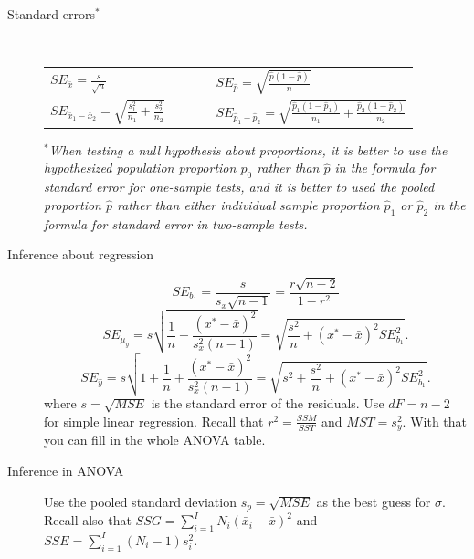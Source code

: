 \documentclass[10pt]{exam}
\newcommand{\ds}{\displaystyle}
\begin{document}
\begin{description}

\item[Standard errors$^*$] ~
\begin{center}
\begin{tabular}{lcl} 
$\ds SE_{\bar{x}} = \frac{s}{\sqrt{n}}$ & ~~~~ & $\ds SE_{\hat{p}} = \sqrt{\frac{\hat{p}(1-\hat{p})}{n}}$ \\
$\ds SE_{\bar{x}_1 - \bar{x}_2} = \sqrt{\frac{s_1^2}{n_1}+\frac{s_2^2}{n_2}}$ &  & $\ds SE_{\hat{p}_1-\hat{p}_2} = \sqrt{\frac{\hat{p}_1(1-\hat{p}_1)}{n_1}+\frac{\hat{p}_2(1-\hat{p}_2)}{n_2}}$ \\
\end{tabular}
\end{center}
$^*$\textit{When testing a null hypothesis about proportions, it is better to use the hypothesized population proportion $p_0$ rather than $\hat{p}$ in the formula for standard error for one-sample tests, and it is better to used the pooled proportion $\hat{p}$ rather than either individual sample proportion $\hat{p}_1$ or $\hat{p}_2$ in the formula for standard error in two-sample tests. }




\item[Inference about regression] 
$$SE_{b_1} = \frac{s}{s_x \sqrt{n - 1}} = \frac{r \sqrt{n-2}}{1-r^2}$$ 
$$SE_{\mu_y} = s \sqrt{\frac{1}{n} + \frac{(x^* - \bar{x})^2}{s_x^2 (n-1)}} = \sqrt{\frac{s^2}{n} + (x^* - \bar{x})^2 SE_{b_1}^2}.$$
$$SE_{\hat{y}} = s \sqrt{1 + \frac{1}{n} + \frac{(x^* - \bar{x})^2}{s_x^2 (n-1)}} = \sqrt{s^2 + \frac{s^2}{n} + (x^* - \bar{x})^2 SE_{b_1}^2}.$$
where $s = \sqrt{MSE}$ is the standard error of the residuals. Use $dF = n - 2$ for simple linear regression.
Recall that $r^2 = \frac{SSM}{SST}$ and $MST = s_y^2$. With that you can fill in the whole ANOVA table.\\


\item[Inference in ANOVA] Use the pooled standard deviation $s_p = \sqrt{MSE}$ as the best guess for $\sigma$.   
Recall also that $SSG = \sum_{i = 1}^I N_i (\bar{x}_i - \bar{x})^2$ and $SSE = \sum_{i = 1}^{I} (N_i-1) s_i^2$. \\


\end{description}
\end{document}
